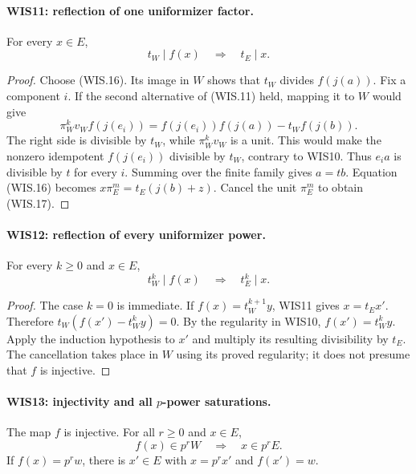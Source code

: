 \documentclass[11pt,a4paper]{article}
\numberwithin{equation}{section}
\theoremstyle{remark}\newtheorem{remark}[theorem]{Remark}
\begin{document}
\paragraph{WIS11: reflection of one uniformizer factor.}
\label{claim:WIS11}
For every $x\in E$,
\[
                         t_W\mid f(x)
                    \quad\Longrightarrow\quad t_E\mid x. \tag{WIS.17}
\]

\begin{proof}
Choose (WIS.16). Its image in $W$ shows that $t_W$
divides $f(j(a))$. Fix a component $i$. If the second
alternative of (WIS.11) held, mapping it to $W$ would give
\[
       \pi_W^kv_W f(j(e_i))
          =f(j(e_i))f(j(a))-t_Wf(j(b)).
\]
The right side is divisible by $t_W$, while
$\pi_W^kv_W$ is a unit. This would make the nonzero
idempotent $f(j(e_i))$ divisible by $t_W$, contrary
to WIS10. Thus $e_i a$ is divisible by $t$ for every $i$.
Summing over the finite family gives $a=tb$. Equation
(WIS.16) becomes $x\pi_E^m=t_E(j(b)+z)$.
Cancel the unit $\pi_E^m$ to obtain (WIS.17).
\end{proof}

\paragraph{WIS12: reflection of every uniformizer power.}
\label{claim:WIS12}
For every $k\geq0$ and $x\in E$,
\[
                      t_W^k\mid f(x)
                 \quad\Longrightarrow\quad t_E^k\mid x.   \tag{WIS.18}
\]

\begin{proof}
The case $k=0$ is immediate. If
$f(x)=t_W^{k+1}y$, WIS11 gives $x=t_Ex'$.
Therefore
$t_W(f(x')-t_W^ky)=0$. By the regularity in WIS10,
$f(x')=t_W^ky$. Apply the induction hypothesis to $x'$
and multiply its resulting divisibility by $t_E$.
The cancellation takes place in $W$ using its proved
regularity; it does not presume that $f$ is injective.
\end{proof}

\paragraph{WIS13: injectivity and all $p$-power saturations.}
\label{claim:WIS13}
The map $f$ is injective. For all $r\geq0$ and $x\in E$,
\[
 f(x)\in p^rW\quad\Longrightarrow\quad x\in p^rE.
                                                               \tag{WIS.19}
\]
If $f(x)=p^rw$, there is $x'\in E$ with
$x=p^rx'$ and $f(x')=w$.
\end{document}
